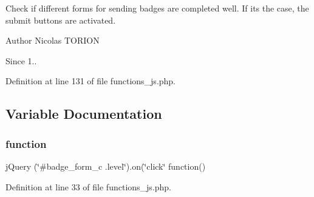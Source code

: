 Check if different forms for sending badges are completed well. If it\textquotesingle{}s the case, the submit buttons are activated.

\begin{DoxyAuthor}{Author}
Nicolas T\+O\+R\+I\+ON 
\end{DoxyAuthor}
\begin{DoxySince}{Since}
1.. 
\end{DoxySince}


Definition at line 131 of file functions\+\_\+js.\+php.



\subsection{Variable Documentation}
\mbox{\label{functions__js_8php_a8469038065f9d14cd1e418d4a56fb290}} 
\subsubsection{\texorpdfstring{function}{function}}
{\footnotesize\ttfamily j\+Query (\char`\"{}\#badge\+\_\+form\+\_\+c .level\char`\"{}).on(\char`\"{}click\char`\"{} function()}



Definition at line 33 of file functions\+\_\+js.\+php.

